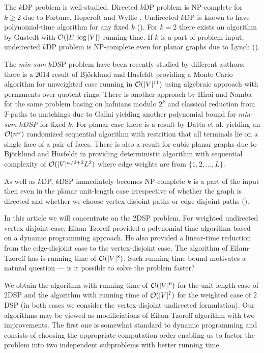 The $k$DP problem is well-studied. Directed $k$DP problem is NP-complete for $k \geq 2$ due to Fortune, Hopcroft and Wyllie \cite{FHW}. Undirected $k$DP is known to have polynomial-time algorithm for any fixed $k$ (\cite{RS}). For $k = 2$ there exists an algorithm by Gustedt \cite{Gustedt} with $\mathcal{O}(|E| \log |V|)$ running time. If $k$ is a part of problem input, undeirected $k$DP problem is NP-complete even for planar graphs due to Lynch (\cite{Lynch}).

The \textit{min-sum} $k$DSP problem have been recently studied by different authors; there is a 2014 result of Björklund and Husfeldt \cite{BHICALP} providing a Monte Carlo algorithm for unweighted case running in $\mathcal{O}(|V|^{11})$ using algebraic approach with permanents over quotent rings. There is another approach by Hirai and Namba \cite{HN} for the same problem basing on hafnians modulo $2^k$ and classical reduction from $T$-paths to matchings due to Gallai \cite{Gallai} yielding another polynomial bound for \textit{min-sum} $kDSP$ for fixed $k$. For planar case there is a result by Datta et al. \cite{Datta} yielding an $\mathcal{O}(n^\omega)$ randomized sequential algorithm with restrition that all terminals lie on a single face of a pair of faces. There is also a result for cubic planar graphs due to Björklund and Husfeldt in \cite{BHPlanar} providing deterministic algorithm with sequential complexity of $\mathcal{O}(|V|^{\omega / 2 + 2} L^2)$ where edge weights are from $\{1, 2, \ldots, L\}$. 

As well as $k$DP, $k$DSP immediately becomes NP-complete $k$ is a part of the input then even in the planar unit-length case irrespective of whether the graph is directed and whether we choose vertex-disjoint paths or edge-disjoint paths (\cite{ET}).

In this article we will concentrate on the 2DSP problem. For weighted undirected vertex-disjoint case, Eilam-Tzoreff provided a polynomial time algorithm based on a dynamic programming approach. He also provided a linear-time reduction from the edge-disjoint case to the vertex-disjoint case. The algorithm of Eilam-Tzoreff has is running time of $\mathcal{O}(|V|^8)$. Such running time bound motivates a natural question --- is it possible to solve the problem faster?

We obtain the algorithm with running time of $\mathcal{O}(|V|^6)$ for the unit-length case of $2$DSP and the algorithm with running time of $\mathcal{O}(|V|^7)$ for the weighted case of $2$DSP (in both cases we consider the vertex-disjoint undirected formulation). Our algorithms may be viewed as modificiations of Eilam-Tzoreff algorithm with two improvements. The first one is somewhat standard to dynamic programming and consists of choosing the appropriate computation order enabling us to factor the problem into two independent subproblems with better running time. 

